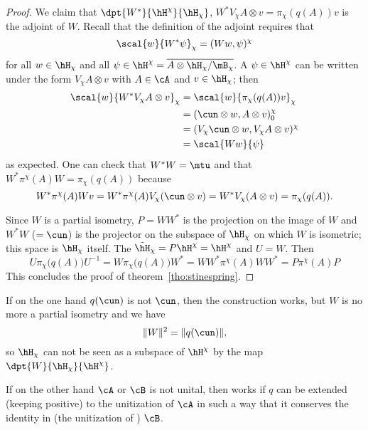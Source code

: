 \begin{proof}
	We claim that $\dpt{ W^* }{ \hH^{\chi} }{ \hH_{\chi} }$, $W^*V_{\chi} A\otimes v=\pi_{\chi}(q(A))v$ is the adjoint of $W$. Recall that the definition of the adjoint requires that
	\[
		\scal{ w }{ W^*\psi }_{\chi}=( Ww , \psi )^{\chi}
	\]
	for all $w\in\hH_{\chi}$ and all $\psi\in\hH^{\chi}=\overline{ A\otimes\hH_{\chi}/\mB_{\chi} }$. A $\psi\in\hH^{\chi}$ can be written under the form $V_{\chi}A\otimes v$ with $A\in\cA$ and $v\in\hH_{\chi}$; then
	\begin{equation}
		\begin{split}
			\scal{ w }{ W^*V_{\chi}A\otimes v }_{\chi}&=\scal{ w }{ \pi_{\chi}(q(A))v }_{\chi}\\
			&=( \cun\otimes w , A\otimes v )_0^{\chi}\\
			&=( V_{\chi}\cun\otimes w , V_{\chi}A\otimes v )^{\chi}\\
			&=\scal{ Ww }{ \psi }
		\end{split}
	\end{equation}
	as expected. One can check that $W^*W=\mtu$ and that $W^*\pi^{\chi}(A)W=\pi_{\chi}(q(A))$ because
	\begin{equation}
		W^*\pi^{\chi}(A)Wv=W^*\pi^{\chi}(A)V_{\chi}(\cun\otimes v)
		=W^*V_{\chi}(A\otimes v)
		=\pi_{\chi}(q(A)).
	\end{equation}


	Since $W$ is a partial isometry, $P=WW^*$ is the projection on the image of $W$ and $W^*W$ ($=\cun$) is the projector on the subspace of $\hH_{\chi}$ on which $W$ is isometric; this space is $\hH_{\chi}$ itself. The $\tilde\hH_{\chi}=P\hH^{\chi}=\hH^{\chi}$ and $U=W$. Then
	\begin{equation}
		U\pi_{\chi}\big( q(A) \big)U^{-1}=W\pi_{\chi}\big( q(A) \big)W^*
		=WW^*\pi^{\chi}(A)WW^*
		=P\pi^{\chi}(A)P
	\end{equation}
	This concludes the proof of theorem~\ref{tho:stinespring}.

\end{proof}


\begin{remark}
	If on the one hand $q(\cun)$ is not $\cun$, then the construction works, but $W$ is no more a partial isometry and we have
	\[
		\| W \|^2=\| q(\cun) \|,
	\]
	so $\hH_{\chi}$ can not be seen as a subspace of $\hH^{\chi}$ by the map $\dpt{W}{ \hH_{\chi} }{ \hH^{\chi} }$.

	If on the other hand $\cA$ or $\cB$ is not unital, then works if $q$ can be extended (keeping positive) to the unitization of $\cA$ in such a way that it conserves the identity in (the unitization of ) $\cB$.
\end{remark}

